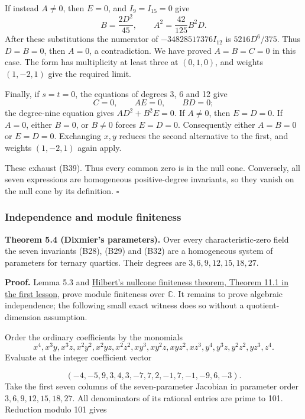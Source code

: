 \documentclass[
]{article}
\begin{document}
If instead \(A\ne0\), then \(E=0\), and \(I_9=I_{15}=0\) give \[
B=\frac{2D^2}{45},\qquad A^2=\frac{42}{125}B^2D.
\] After these substitutions the numerator of \(-34828517376I_{12}\) is
\(5216D^6/375\). Thus \(D=B=0\), then \(A=0\), a contradiction. We have
proved \(A=B=C=0\) in this case. The form has multiplicity at least
three at \((0,1,0)\), and weights \((1,-2,1)\) give the required limit.

Finally, if \(s=t=0\), the equations of degrees 3, 6 and 12 give \[
C=0,\qquad AE=0,\qquad BD=0;
\] the degree-nine equation gives \(AD^2+B^2E=0\). If \(A\ne0\), then
\(E=D=0\). If \(A=0\), either \(B=0\), or \(B\ne0\) forces \(E=D=0\).
Consequently either \(A=B=0\) or \(E=D=0\). Exchanging \(x,y\) reduces
the second alternative to the first, and weights \((1,-2,1)\) again
apply.

These exhaust (B39). Thus every common zero is in the null cone.
Conversely, all seven expressions are homogeneous positive-degree
invariants, so they vanish on the null cone by its definition.
\(\square\)

\subsubsection{Independence and module
finiteness}\label{independence-and-module-finiteness}

\protect{}\label{theorem-5-4}{}

\textbf{Theorem 5.4 (Dixmier's parameters).} Over every
characteristic-zero field the seven invariants (B28), (B29) and (B32)
are a homogeneous system of parameters for ternary quartics. Their
degrees are \(3,6,9,12,15,18,27\).

\textbf{Proof.} Lemma 5.3 and
\href{NOE-INV-01.html\#theorem-11-1}{Hilbert's nullcone finiteness
theorem, Theorem 11.1 in the first lesson}, prove module finiteness over
\(\mathbb C\). It remains to prove algebraic independence; the following
small exact witness does so without a quotient-dimension assumption.

Order the ordinary coefficients by the monomials \[
x^4,x^3y,x^3z,x^2y^2,x^2yz,x^2z^2,xy^3,
xy^2z,xyz^2,xz^3,y^4,y^3z,y^2z^2,yz^3,z^4.
\] Evaluate at the integer coefficient vector
\protect{}\label{equation-B43}{}

\[
(-4,-5,9,3,4,3,-7,7,2,-1,7,-1,-9,6,-3).
\tag{B43}
\] Take the first seven columns of the seven-parameter Jacobian in
parameter order \(3,6,9,12,15,18,27\). All denominators of its rational
entries are prime to 101. Reduction modulo 101 gives
\protect{}\label{equation-B44}{}
\end{document}

